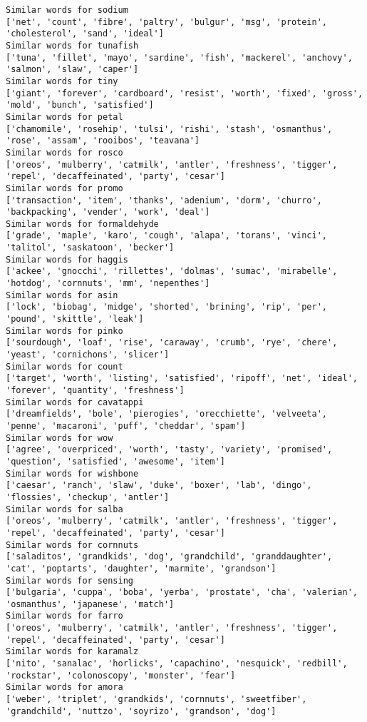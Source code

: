 \documentclass[11pt]{article}
\begin{document}
\begin{Verbatim}[commandchars=\\\{\}]
Similar words for sodium
['net', 'count', 'fibre', 'paltry', 'bulgur', 'msg', 'protein', 'cholesterol', 'sand', 'ideal']
Similar words for tunafish
['tuna', 'fillet', 'mayo', 'sardine', 'fish', 'mackerel', 'anchovy', 'salmon', 'slaw', 'caper']
Similar words for tiny
['giant', 'forever', 'cardboard', 'resist', 'worth', 'fixed', 'gross', 'mold', 'bunch', 'satisfied']
Similar words for petal
['chamomile', 'rosehip', 'tulsi', 'rishi', 'stash', 'osmanthus', 'rose', 'assam', 'rooibos', 'teavana']
Similar words for rosco
['oreos', 'mulberry', 'catmilk', 'antler', 'freshness', 'tigger', 'repel', 'decaffeinated', 'party', 'cesar']
Similar words for promo
['transaction', 'item', 'thanks', 'adenium', 'dorm', 'churro', 'backpacking', 'vender', 'work', 'deal']
Similar words for formaldehyde
['grade', 'maple', 'karo', 'cough', 'alapa', 'torans', 'vinci', 'talitol', 'saskatoon', 'becker']
Similar words for haggis
['ackee', 'gnocchi', 'rillettes', 'dolmas', 'sumac', 'mirabelle', 'hotdog', 'cornnuts', 'mm', 'nepenthes']
Similar words for asin
['lock', 'biobag', 'midge', 'shorted', 'brining', 'rip', 'per', 'pound', 'skittle', 'leak']
Similar words for pinko
['sourdough', 'loaf', 'rise', 'caraway', 'crumb', 'rye', 'chere', 'yeast', 'cornichons', 'slicer']
Similar words for count
['target', 'worth', 'listing', 'satisfied', 'ripoff', 'net', 'ideal', 'forever', 'quantity', 'freshness']
Similar words for cavatappi
['dreamfields', 'bole', 'pierogies', 'orecchiette', 'velveeta', 'penne', 'macaroni', 'puff', 'cheddar', 'spam']
Similar words for wow
['agree', 'overpriced', 'worth', 'tasty', 'variety', 'promised', 'question', 'satisfied', 'awesome', 'item']
Similar words for wishbone
['caesar', 'ranch', 'slaw', 'duke', 'boxer', 'lab', 'dingo', 'flossies', 'checkup', 'antler']
Similar words for salba
['oreos', 'mulberry', 'catmilk', 'antler', 'freshness', 'tigger', 'repel', 'decaffeinated', 'party', 'cesar']
Similar words for cornnuts
['saladitos', 'grandkids', 'dog', 'grandchild', 'granddaughter', 'cat', 'poptarts', 'daughter', 'marmite', 'grandson']
Similar words for sensing
['bulgaria', 'cuppa', 'boba', 'yerba', 'prostate', 'cha', 'valerian', 'osmanthus', 'japanese', 'match']
Similar words for farro
['oreos', 'mulberry', 'catmilk', 'antler', 'freshness', 'tigger', 'repel', 'decaffeinated', 'party', 'cesar']
Similar words for karamalz
['nito', 'sanalac', 'horlicks', 'capachino', 'nesquick', 'redbill', 'rockstar', 'colonoscopy', 'monster', 'fear']
Similar words for amora
['weber', 'triplet', 'grandkids', 'cornnuts', 'sweetfiber', 'grandchild', 'nuttzo', 'soyrizo', 'grandson', 'dog']

\end{Verbatim}
\end{document}
